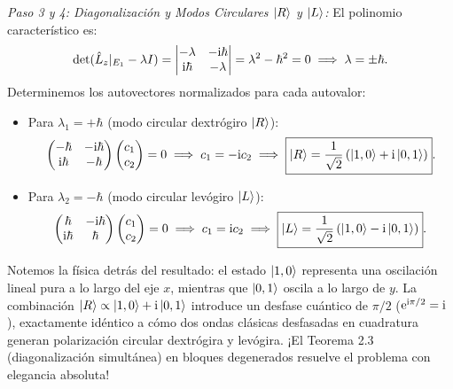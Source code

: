 \begin{ejemplobox}
    \textit{Paso 3 y 4: Diagonalización y Modos Circulares $\left| R \right\rangle$ y $\left| L \right\rangle$:}
    El polinomio característico es:
    \begin{equation}
        \det(\hat{L}_z|_{E_1} - \lambda I) = \begin{vmatrix} -\lambda & -\mathrm{i}\hbar \\ \mathrm{i}\hbar & -\lambda \end{vmatrix} = \lambda^2 - \hbar^2 = 0 \implies \lambda = \pm\hbar.
    \end{equation}
    Determinemos los autovectores normalizados para cada autovalor:
    \begin{itemize}
        \item Para $\lambda_1 = +\hbar$ (modo circular dextrógiro $\left| R \right\rangle$):
        \begin{equation}
            \begin{pmatrix} -\hbar & -\mathrm{i}\hbar \\ \mathrm{i}\hbar & -\hbar \end{pmatrix}\begin{pmatrix} c_1 \\ c_2 \end{pmatrix} = 0 \implies c_1 = -\mathrm{i} c_2 \implies \boxed{\left| R \right\rangle = \frac{1}{\sqrt{2}}\left( \left| 1, 0 \right\rangle + \mathrm{i}\left| 0, 1 \right\rangle \right)}.
        \end{equation}
        \item Para $\lambda_2 = -\hbar$ (modo circular levógiro $\left| L \right\rangle$):
        \begin{equation}
            \begin{pmatrix} \hbar & -\mathrm{i}\hbar \\ \mathrm{i}\hbar & \hbar \end{pmatrix}\begin{pmatrix} c_1 \\ c_2 \end{pmatrix} = 0 \implies c_1 = \mathrm{i} c_2 \implies \boxed{\left| L \right\rangle = \frac{1}{\sqrt{2}}\left( \left| 1, 0 \right\rangle - \mathrm{i}\left| 0, 1 \right\rangle \right)}.
        \end{equation}
    \end{itemize}
    Notemos la física detrás del resultado: el estado $\left| 1, 0 \right\rangle$ representa una oscilación lineal pura a lo largo del eje $x$, mientras que $\left| 0, 1 \right\rangle$ oscila a lo largo de $y$. La combinación $\left| R \right\rangle \propto \left| 1, 0 \right\rangle + \mathrm{i}\left| 0, 1 \right\rangle$ introduce un desfase cuántico de $\pi/2$ ($\mathrm{e}^{\mathrm{i}\pi/2} = \mathrm{i}$), exactamente idéntico a cómo dos ondas clásicas desfasadas en cuadratura generan polarización circular dextrógira y levógira. ¡El Teorema 2.3 (diagonalización simultánea) en bloques degenerados resuelve el problema con elegancia absoluta!
\end{ejemplobox}

